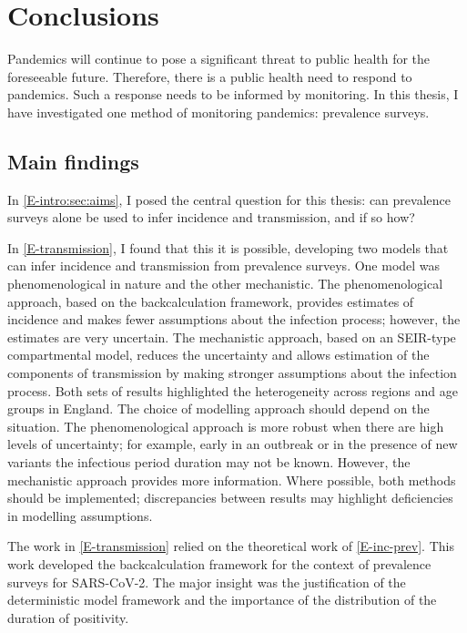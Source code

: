 \documentclass[thesis.tex]{subfiles}
\begin{document}
\ifSubfilesClassLoaded{
    \setcounter{chapter}{7}
}

\chapter{Conclusions} \label{conclusion}

Pandemics will continue to pose a significant threat to public health for the foreseeable future.
Therefore, there is a public health need to respond to pandemics.
Such a response needs to be informed by monitoring.
In this thesis, I have investigated one method of monitoring pandemics: prevalence surveys.

\section{Main findings}

In \cref{E-intro:sec:aims}, I posed the central question for this thesis: can prevalence surveys alone be used to infer incidence and transmission, and if so how?

In \cref{E-transmission}, I found that this it is possible, developing two models that can infer incidence and transmission from prevalence surveys.
One model was phenomenological in nature and the other mechanistic.
The phenomenological approach, based on the backcalculation framework, provides estimates of incidence and makes fewer assumptions about the infection process; however, the estimates are very uncertain.
The mechanistic approach, based on an SEIR-type compartmental model, reduces the uncertainty and allows estimation of the components of transmission by making stronger assumptions about the infection process.
Both sets of results highlighted the heterogeneity across regions and age groups in England.
The choice of modelling approach should depend on the situation.
The phenomenological approach is more robust when there are high levels of uncertainty; for example, early in an outbreak or in the presence of new variants the infectious period duration may not be known.
However, the mechanistic approach provides more information.
Where possible, both methods should be implemented; discrepancies between results may highlight deficiencies in modelling assumptions.

The work in \cref{E-transmission} relied on the theoretical work of \cref{E-inc-prev}.
This work developed the backcalculation framework for the context of prevalence surveys for SARS-CoV-2.
The major insight was the justification of the deterministic model framework and the importance of the distribution of the duration of positivity.
\end{document}
